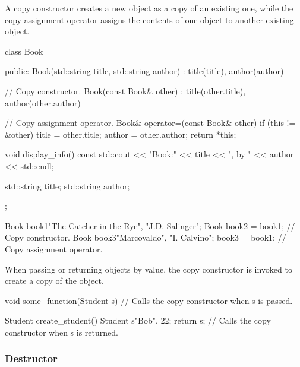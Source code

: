 \vspace{-0.3em}

A copy constructor creates a new object as a copy of an existing one, while the copy assignment operator assigns the contents of one object to another existing object.

\vspace{-0.3em}

\begin{codeblock}[language=C++, numbers=none]
class Book {
public:
    Book(std::string title, std::string author) 
        : title(title), author(author) {}

    // Copy constructor.
    Book(const Book& other)
        : title(other.title), author(other.author) {}

    // Copy assignment operator.
    Book& operator=(const Book& other) {
        if (this != &other) {
            title = other.title;
            author = other.author;
        }
        return *this;
    }

    void display_info() const {
        std::cout << "Book:" << title << ", by " << author << std::endl;
    }

    std::string title;
    std::string author;
};

Book book1{"The Catcher in the Rye", "J.D. Salinger"};
Book book2 = book1; // Copy constructor.
Book book3{"Marcovaldo", "I. Calvino"};
book3 = book1; // Copy assignment operator.
\end{codeblock}

\begin{observationblock}
    When passing or returning objects by value, the copy constructor is invoked to create a copy of the object.

\begin{codeblock}[language=C++]
void some_function(Student s) {
    // Calls the copy constructor when s is passed.
}

Student create_student() {
    Student s{"Bob", 22};
    return s; // Calls the copy constructor when s is returned.
}
\end{codeblock}
\end{observationblock}

\subsubsection{Destructor}

\vspace{-0.2em}

